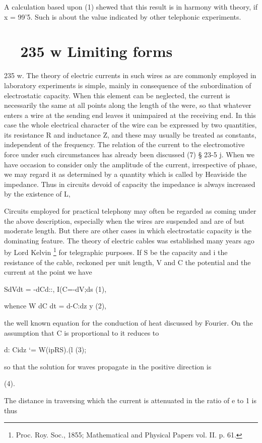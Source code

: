 A calculation based upon (1) shewed that this result is in harmony
with theory, if x = 99'5. Such is about the value indicated by
other telephonic experiments.

\section{~~235 w Limiting forms}
235 w. The theory of electric currents in such wires as are
commonly employed in laboratory experiments is simple, mainly in
consequence of the subordination of electrostatic capacity. When
this element can be neglected, the current is necessarily the same
at all points along the length of the were, so that whatever enters
a wire at the sending end leaves it unimpaired at the receiving
end. In this case the whole electrical character of the wire can
be expressed by two quantities, its resistance R and inductance Z,
and these may usually be treated as constants, independent of the
frequency. The relation of the current to the electromotive force
under such circumstances has already been discussed (7) § 23-5 j.
When we have occasion to consider only the amplitude of the
current, irrespective of phase, we may regard it as determined
by a quantity which is called by Heaviside the
impedance. Thus in circuits devoid of capacity the impedance is
always increased by the existence of L,


Circuits employed for practical telephony may often be regarded as coming
under the above description, especially when
the wires are suspended and are of but moderate length. But
there are other cases in which electrostatic capacity is the dominating
feature. The theory of electric cables was established
many years ago by Lord Kelvin
\footnote{Proc. Roy. Soc., 1855; Mathematical and Physical Papers vol. II. p. 61.}
for telegraphic purposes. If S
be the capacity and i the resistance of the cable, reckoned per
unit length, V and C the potential and the current at the point we have

SdVdt = -dCd::, I(C=-dV;ds (1),

whence W dC dt = d-C:dz y (2),

the well known equation for the conduction of heat discussed by
Fourier. On the assumption that C is proportional to it
reduces to

d: Cidz ‘= W(ipRS).(l (3);

so that the solution for waves propagate in the positive direction is

(4).

The distance in traversing which the current is attenuated in the
ratio of e to 1 is thus

